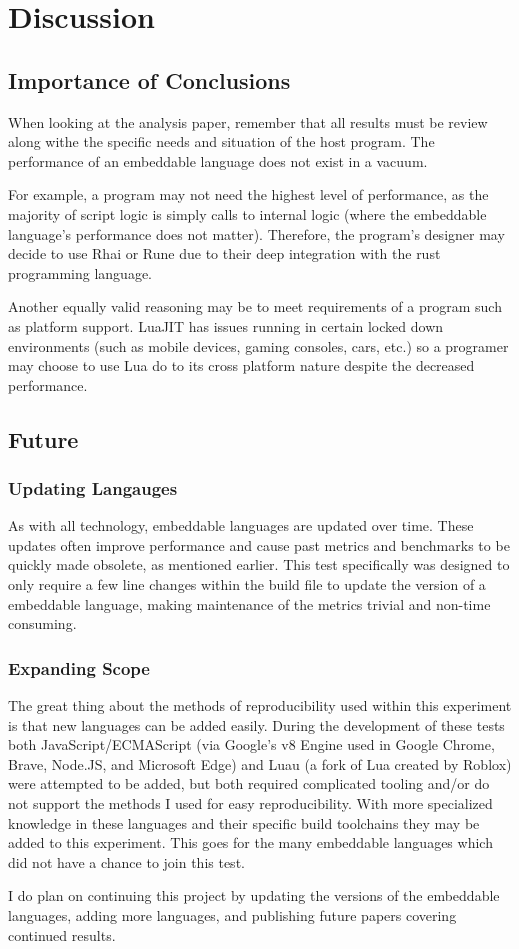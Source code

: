 \section{Discussion}

\subsection{Importance of Conclusions}
When looking at the analysis paper, remember that all results must be review along withe the specific needs and situation of the host program. The performance of an embeddable language does not exist in a vacuum.

For example, a program may not need the highest level of performance, as the majority of script logic is simply calls to internal logic (where the embeddable language's performance does not matter). Therefore, the program's designer may decide to use Rhai or Rune due to their deep integration with the rust programming language.

Another equally valid reasoning may be to meet requirements of a program such as platform support. LuaJIT has issues running in certain locked down environments\cite{luajit:consoles} (such as mobile devices, gaming consoles, cars, etc.) so a programer may choose to use Lua do to its cross platform nature despite the decreased performance.

\subsection{Future}

\subsubsection{Updating Langauges}
As with all technology, embeddable languages are updated over time. These updates often improve performance and cause past metrics and benchmarks to be quickly made obsolete, as mentioned earlier. This test specifically was designed to only require a few line changes within the build file to update the version of a embeddable language, making maintenance of the metrics trivial and non-time consuming.

\subsubsection{Expanding Scope}
The great thing about the methods of reproducibility used within this experiment is that new languages can be added easily. During the development of these tests both JavaScript/ECMAScript (via Google's v8 Engine\cite{v8} used in Google Chrome, Brave, Node.JS, and Microsoft Edge) and Luau (a fork of Lua created by Roblox\cite{luau}) were attempted to be added, but both required complicated tooling and/or do not support the methods I used for easy reproducibility. With more specialized knowledge in these languages and their specific build toolchains they may be added to this experiment. This goes for the many embeddable languages which did not have a chance to join this test.

I do plan on continuing this project by updating the versions of the embeddable languages, adding more languages, and publishing future papers covering continued results.
